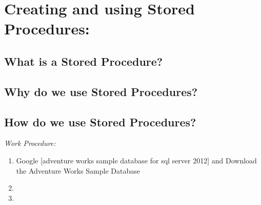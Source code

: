 \section {Creating and using Stored Procedures:}


\subsection{What is a Stored Procedure?}


\subsection{Why do we use Stored Procedures?}


\subsection{How do we use Stored Procedures?}



\emph{Work Procedure:}

\begin{enumerate}
    \item Google [adventure works sample database for sql server 2012] and Download the Adventure Works Sample Database
    \item 
    \item 
\end{enumerate}

